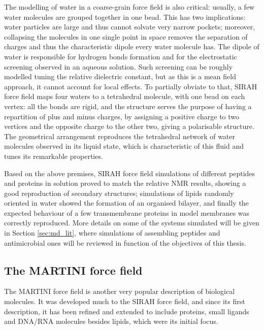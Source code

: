 The modelling of water in a coarse-grain force field is also critical: usually, a few water molecules are grouped together in one bead. This has two implications: water particles are large and thus cannot solvate very narrow pockets; moreover, collapsing the molecules in one single point in space removes the separation of charges and thus the characteristic dipole every water molecule has. The dipole of water is responsible for hydrogen bonds formation and for the electrostatic screening observed in an aqueous solution. Such screening can be roughly modelled tuning the relative dielectric constant, but as this is a mean field approach, it cannot account for local effects.
%
To partially obviate to that, SIRAH force field maps four waters to a tetrahedral molecule, with one bead on each vertex: all the bonds are rigid, and the structure serves the purpose of having a repartition of plus and minus charges, by assigning a positive charge to two vertices and the opposite charge to the other two, giving a polarisable structure. The geometrical arrangement reproduces the tetrahedral network of water molecules observed in its liquid state, which is characteristic of this fluid and tunes its remarkable properties.

Based on the above premises, SIRAH force field simulations of different peptides and proteins in solution proved to match the relative NMR results, showing a good reproduction of secondary structures; simulations of lipids randomly oriented in water showed the formation of an organised bilayer, and finally the expected behaviour of a few transmembrane proteins in model membranes was correctly reproduced. More details on some of the systems simulated will be given in Section \ref{sec:md_lit}, where simulations of assembling peptides and antimicrobial ones will be reviewed in function of the objectives of this thesis.

 
\subsection{The MARTINI force field}
The MARTINI force field is another very popular description of biological molecules. It was developed much to the SIRAH force field, and since its first description, it has been refined and extended to include proteins, small ligands and DNA/RNA molecules besides lipids, which were its initial focus. 

